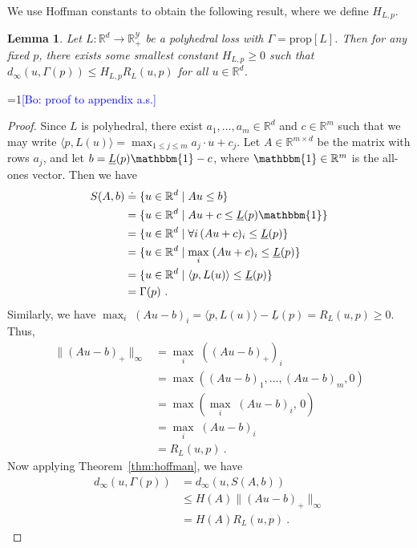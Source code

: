 \documentclass{article}
\newtheorem{lemma}{Lemma}
\theoremstyle{definition}\newtheorem{definition}{Definition}
\theoremstyle{definition}\newtheorem{assumption}{Assumption}
\newcommand{\Comments}{1}
\newcommand{\mynote}[2]{\ifnum\Comments=1\textcolor{#1}{#2}\fi}
\newcommand{\bo}[1]{\mynote{blue}{[Bo: #1]}}
\newcommand{\reals}{\mathbb{R}}
\newcommand{\defeq}{\doteq}%
\newcommand{\prop}[1]{\mathrm{prop}[#1]}
\newcommand{\Y}{\mathcal{Y}}
\newcommand{\risk}[1]{\underline{#1}}
\newcommand{\inprod}[2]{\langle #1, #2 \rangle}%
\newcommand{\ones}{\mathbbm{1}}
\newcommand{\regret}[3]{R_{#1}(#2,#3)}
\begin{document}
We use Hoffman constants to obtain the following result, where we define $H_{L,p}$.
\begin{lemma} \label{lemma:hoffman-polyhedral}
  Let $L: \reals^d \to \reals_+^{\Y}$ be a polyhedral loss with $\Gamma = \prop{L}$.
  Then for any fixed $p$, there exists some smallest constant $H_{L,p} \geq 0$ such that $d_{\infty}(u,\Gamma(p)) \leq H_{L,p} R_L(u,p)$ for all $u \in \reals^d$.
\end{lemma}
\bo{proof to appendix a.s.}
\begin{proof}
  Since $L$ is polyhedral, there exist $a_1,\ldots,a_m \in \reals^d$ and $c\in\reals^m$ such that we may write $\inprod{p}{L(u)} = \max_{1\leq j\leq m} a_j \cdot u + c_j$.
  Let $A \in \reals^{m\times d}$ be the matrix with rows $a_j$, and let $b = \risk{L}(p)\ones - c$, where $\ones\in\reals^m$ is the all-ones vector.
  Then we have
  \begin{align*}
    S(A,b)
    &\defeq \{u\in\reals^d \mid A u \leq b\}
    \\
    &= \{u\in\reals^d \mid A u + c \leq \risk{L}(p)\ones\}
    \\
    &= \{u\in\reals^d \mid \forall i\, (A u + c)_i \leq \risk{L}(p)\}
    \\
    &= \{u\in\reals^d \mid \max_i \;(A u + c)_i \leq \risk{L}(p)\}
    \\
    &= \{u\in\reals^d \mid \inprod{p}{L(u)} \leq \risk{L}(p)\}
    \\
    & = \Gamma(p)~.
  \end{align*}
  Similarly, we have $\max_i\; (A u - b)_i = \inprod{p}{L(u)} - \risk{L}(p) = \regret{L}{u}{p} \geq 0$.
  Thus,
  \begin{align*}
    \|(Au - b)_+\|_\infty
    &= \max_i\; ((Au - b)_+)_i
    \\
    &= \max((Au - b)_1,\ldots,(Au - b)_m, 0)
    \\
    &= \max(\max_i\; (Au - b)_i, \, 0)
    \\
    &= \max_i\; (Au - b)_i
    \\
    &= \regret{L}{u}{p}~.
  \end{align*}
  Now applying Theorem~\ref{thm:hoffman}, we have
  \begin{align*}
    d_\infty(u,\Gamma(p))
    &=    d_\infty(u,S(A,b))
    \\
    &\leq H(A) \|(Au-b)_+\|_\infty
    \\
    &= H(A) \regret{L}{u}{p}~.
  \end{align*}
\end{proof}
\end{document}
